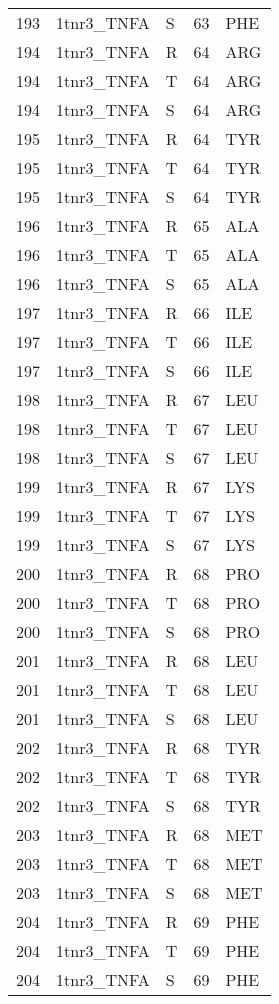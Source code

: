 \begin{tiny}
\begin{longtable}[l]{l|l|l|l|l}
	193 & 1tnr3\_TNFA & S & 63 & PHE \\
	194 & 1tnr3\_TNFA & R & 64 & ARG \\
	194 & 1tnr3\_TNFA & T & 64 & ARG \\
	194 & 1tnr3\_TNFA & S & 64 & ARG \\
	195 & 1tnr3\_TNFA & R & 64 & TYR \\
	195 & 1tnr3\_TNFA & T & 64 & TYR \\
	195 & 1tnr3\_TNFA & S & 64 & TYR \\
	196 & 1tnr3\_TNFA & R & 65 & ALA \\
	196 & 1tnr3\_TNFA & T & 65 & ALA \\
	196 & 1tnr3\_TNFA & S & 65 & ALA \\
	197 & 1tnr3\_TNFA & R & 66 & ILE \\
	197 & 1tnr3\_TNFA & T & 66 & ILE \\
	197 & 1tnr3\_TNFA & S & 66 & ILE \\
	198 & 1tnr3\_TNFA & R & 67 & LEU \\
	198 & 1tnr3\_TNFA & T & 67 & LEU \\
	198 & 1tnr3\_TNFA & S & 67 & LEU \\
	199 & 1tnr3\_TNFA & R & 67 & LYS \\
	199 & 1tnr3\_TNFA & T & 67 & LYS \\
	199 & 1tnr3\_TNFA & S & 67 & LYS \\
	200 & 1tnr3\_TNFA & R & 68 & PRO \\
	200 & 1tnr3\_TNFA & T & 68 & PRO \\
	200 & 1tnr3\_TNFA & S & 68 & PRO \\
	201 & 1tnr3\_TNFA & R & 68 & LEU \\
	201 & 1tnr3\_TNFA & T & 68 & LEU \\
	201 & 1tnr3\_TNFA & S & 68 & LEU \\
	202 & 1tnr3\_TNFA & R & 68 & TYR \\
	202 & 1tnr3\_TNFA & T & 68 & TYR \\
	202 & 1tnr3\_TNFA & S & 68 & TYR \\
	203 & 1tnr3\_TNFA & R & 68 & MET \\
	203 & 1tnr3\_TNFA & T & 68 & MET \\
	203 & 1tnr3\_TNFA & S & 68 & MET \\
	204 & 1tnr3\_TNFA & R & 69 & PHE \\
	204 & 1tnr3\_TNFA & T & 69 & PHE \\
	204 & 1tnr3\_TNFA & S & 69 & PHE \\

\end{longtable}
\end{tiny}

